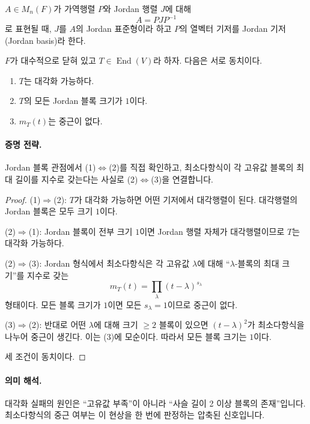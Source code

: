 \begin{definition}
$A\in M_n(F)$가 가역행렬 $P$와 Jordan 행렬 $J$에 대해
$$
A=PJP^{-1}
$$
로 표현될 때, $J$를 $A$의 Jordan 표준형이라 하고 $P$의 열벡터 기저를 Jordan 기저(Jordan basis)라 한다.
\end{definition}

\begin{theorem}
$F$가 대수적으로 닫혀 있고 $T\in\operatorname{End}(V)$라 하자. 다음은 서로 동치이다.
\begin{enumerate}[label=(\arabic*)]
\item $T$는 대각화 가능하다.
\item $T$의 모든 Jordan 블록 크기가 $1$이다.
\item $m_T(t)$는 중근이 없다.
\end{enumerate}
\end{theorem}

\paragraph{증명 전략.}
Jordan 블록 관점에서 (1)$\Leftrightarrow$(2)를 직접 확인하고, 최소다항식이 각 고유값 블록의 최대 길이를 지수로 갖는다는 사실로 (2)$\Leftrightarrow$(3)을 연결합니다.

\begin{proof}
(1)$\Rightarrow$(2): $T$가 대각화 가능하면 어떤 기저에서 대각행렬이 된다. 대각행렬의 Jordan 블록은 모두 크기 $1$이다.

(2)$\Rightarrow$(1): Jordan 블록이 전부 크기 $1$이면 Jordan 행렬 자체가 대각행렬이므로 $T$는 대각화 가능하다.

(2)$\Rightarrow$(3): Jordan 형식에서 최소다항식은 각 고유값 $\lambda$에 대해 ``$\lambda$-블록의 최대 크기''를 지수로 갖는
$$
m_T(t)=\prod_{\lambda}(t-\lambda)^{s_\lambda}
$$
형태이다. 모든 블록 크기가 $1$이면 모든 $s_\lambda=1$이므로 중근이 없다.

(3)$\Rightarrow$(2): 반대로 어떤 $\lambda$에 대해 크기 $\ge2$ 블록이 있으면 $(t-\lambda)^2$가 최소다항식을 나누어 중근이 생긴다. 이는 (3)에 모순이다. 따라서 모든 블록 크기는 $1$이다.

세 조건이 동치이다.
\end{proof}

\paragraph{의미 해석.}
대각화 실패의 원인은 ``고유값 부족''이 아니라 ``사슬 길이 2 이상 블록의 존재''입니다. 최소다항식의 중근 여부는 이 현상을 한 번에 판정하는 압축된 신호입니다.

